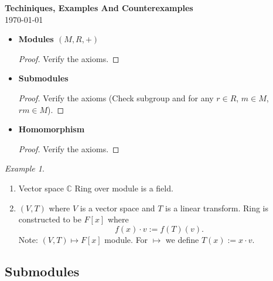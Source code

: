 \documentclass[11pt]{article}
\theoremstyle{definition}
\theoremstyle{remark}
\newtheorem{example}{Example}[section]
\begin{document}
\begin{center}
{\Large\textbf{Techiniques,  Examples And Counterexamples}}\\
\vspace{0.3cm}
{\normalsize\today}
\end{center}
\vspace{0.5cm}


\begin{itemize}
    \item \textbf{Modules $(M, R, +)$}
    \begin{proof}
        Verify the axioms.
    \end{proof}

    \item \textbf{Submodules}
    \begin{proof}
        Verify the axioms (Check subgroup and for any $r \in R$, $m \in M$, $rm \in M$).
    \end{proof}

    \item \textbf{Homomorphism}
    \begin{proof}
        Verify the axioms.
    \end{proof}
\end{itemize}


\begin{example}\label{ex:modules}
    \begin{enumerate}
        \item Vector space $\mathbb{C}$ Ring over module is a field.
        \item $(V, T)$ where $V$ is a vector space and $T$ is a linear transform. Ring is constructed to be $F[x]$ where
              \[
              f(x) \cdot v := f(T)(v).
              \]
              Note: $(V, T) \longmapsto F[x]$ module.
              For $\longmapsto$ we define $T(x) := x \cdot v$.
    \end{enumerate}
\end{example}

\subsection*{Submodules}
\end{document}
